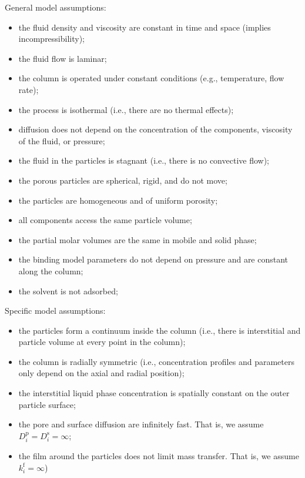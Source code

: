 \documentclass{article}
\begin{document}
General model assumptions:
\begin{itemize}
    \item the fluid density and viscosity are constant in time and space (implies incompressibility);
    \item the fluid flow is laminar;
    \item the column is operated under constant conditions (e.g., temperature, flow rate);
    \item the process is isothermal (i.e., there are no thermal effects);
    \item diffusion does not depend on the concentration of the components, viscosity of the fluid, or pressure;
    \item the fluid in the particles is stagnant (i.e., there is no convective flow);
    \item the porous particles are spherical, rigid, and do not move;
    \item the particles are homogeneous and of uniform porosity;
    \item all components access the same particle volume;
    \item the partial molar volumes are the same in mobile and solid phase;
    \item the binding model parameters do not depend on pressure and are constant along the column;
    \item the solvent is not adsorbed;
\end{itemize}

Specific model assumptions:
\begin{itemize}
    \item the particles form a continuum inside the column (i.e., there is interstitial and particle volume at every point in the column);
    \item the column is radially symmetric (i.e., concentration profiles and parameters only depend on the axial and radial position);
    \item the interstitial liquid phase concentration is spatially constant on the outer particle surface;
    \item the pore and surface diffusion are infinitely fast. That is, we assume $D^{\mathrm{p}}_{i} = D^{\mathrm{s}}_{i} = \infty$;
    \item the film around the particles does not limit mass transfer. That is, we assume $k^{\mathrm{f}}_{i} = \infty$)
\end{itemize}
\end{document}
